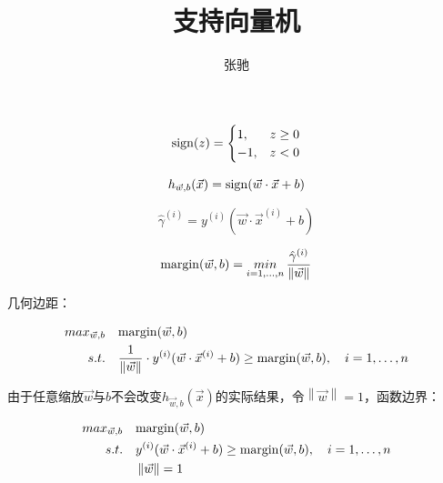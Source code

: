 \documentclass[letterpaper,11pt]{article}
\numberwithin{equation}{section}
\begin{document}
\title{支持向量机}
\author{张驰}
\maketitle

\begin{equation}
    {\rm sign}(z)=\begin{cases} 1, &z\geq0\\ -1, &z<0\end{cases}
\end{equation}

\begin{equation}
    h_{{\vec{w}},b}(\vec{x})={\rm sign}(\vec{w} \cdot \vec{x}+b)
\end{equation}

\begin{equation}
    \hat{\gamma}^{(i)}=y^{(i)}(\vec{w} \cdot \vec{x}^{(i)}+b)
\end{equation}

\begin{equation}
    {\rm margin}(\vec{w},b) = \mathop{min} \limits_{i=1,\dots,n} \frac{\hat{\gamma}^{(i)}}{\left \| \vec{w} \right \|}
\end{equation}

几何边距：

\begin{equation}
    \begin{aligned}
        max_{\vec{w},b} \quad & {\rm margin}(\vec{w},b)                                                                                                                                       \\
        s.t. \quad            & \frac{1}{\left \| \vec{w} \right \|} \cdot y^{(i)}(\vec{w} \cdot \vec{x}^{(i)} + b) \ge {\rm margin}(\vec{w},b), \quad i=1,\dots,n
    \end{aligned}
\end{equation}

由于任意缩放$\vec{w}$与$b$不会改变$h_{{\vec{w}},b}(\vec{x})$的实际结果，令$\left \| \vec{w} \right \| = 1$，函数边界：

\begin{equation}
    \begin{aligned}
        max_{\vec{w},b} \quad & {\rm margin}(\vec{w},b)                                                                 \\
        s.t. \quad            & y^{(i)}(\vec{w} \cdot \vec{x}^{(i)} + b) \ge {\rm margin}(\vec{w},b), \quad i=1,\dots,n \\
                              & \left \| \vec{w} \right \| = 1
    \end{aligned}
\end{equation}
\end{document}
